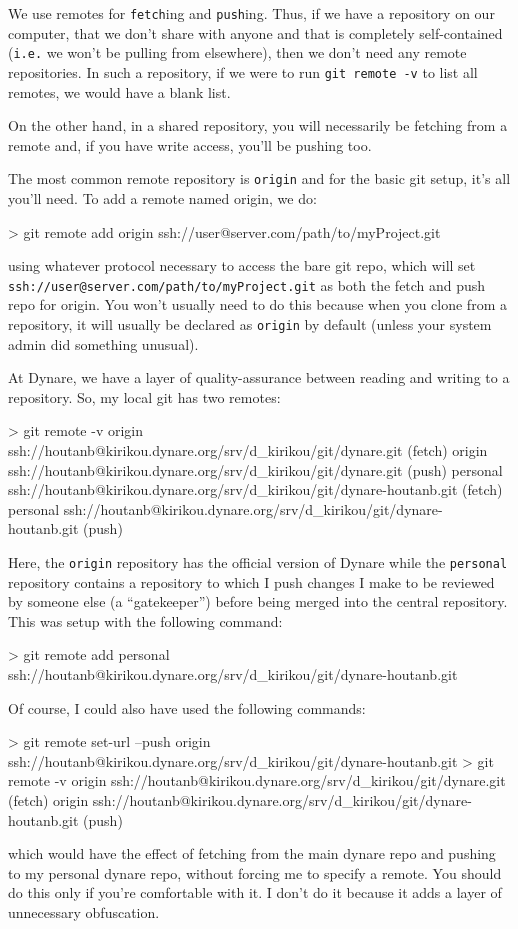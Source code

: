 \documentclass[10pt,letterpaper]{article}
\begin{document}
We use remotes for \texttt{fetch}ing and \texttt{push}ing. Thus, if we have a repository on our computer, that we don't share with anyone and that is completely self-contained (\texttt{i.e.} we won't be pulling from elsewhere), then we don't need any remote repositories. In such a repository, if we were to run \texttt{git remote -v} to list all remotes, we would have a blank list.

On the other hand, in a shared repository, you will necessarily be fetching from a remote and, if you have write access, you'll be pushing too.

The most common remote repository is \texttt{origin} and for the basic git setup, it's all you'll need. To add a remote named origin, we do:
\begin{code}
> git remote add origin ssh://user@server.com/path/to/myProject.git
\end{code}
\noindent using whatever protocol necessary to access the bare git repo, which will set \texttt{ssh://user@server.com/path/to/myProject.git} as both the fetch and push repo for origin. You won't usually need to do this because when you clone from a repository, it will usually be declared as \texttt{origin} by default (unless your system admin did something unusual).

\noindent At Dynare, we have a layer of quality-assurance between reading and writing to a repository. So, my local git has two remotes:
\begin{code}
> git remote -v
origin  ssh://houtanb@kirikou.dynare.org/srv/d_kirikou/git/dynare.git (fetch)
origin  ssh://houtanb@kirikou.dynare.org/srv/d_kirikou/git/dynare.git (push)
personal  ssh://houtanb@kirikou.dynare.org/srv/d_kirikou/git/dynare-houtanb.git (fetch)
personal  ssh://houtanb@kirikou.dynare.org/srv/d_kirikou/git/dynare-houtanb.git (push)
\end{code}
\noindent Here, the \texttt{origin} repository has the official version of Dynare while the \texttt{personal} repository contains a repository to which I push changes I make to be reviewed by someone else (a ``gatekeeper'') before being merged into the central repository. This was setup with the following command:
\begin{code}
> git remote add personal ssh://houtanb@kirikou.dynare.org/srv/d_kirikou/git/dynare-houtanb.git
\end{code}
\noindent Of course, I could also have used the following commands:
\begin{code}
> git remote set-url --push origin ssh://houtanb@kirikou.dynare.org/srv/d_kirikou/git/dynare-houtanb.git
> git remote -v
origin  ssh://houtanb@kirikou.dynare.org/srv/d_kirikou/git/dynare.git (fetch)
origin  ssh://houtanb@kirikou.dynare.org/srv/d_kirikou/git/dynare-houtanb.git (push)
\end{code}
\noindent which would have the effect of fetching from the main dynare repo and pushing to my personal dynare repo, without forcing me to specify a remote. You should do this only if you're comfortable with it. I don't do it because it adds a layer of unnecessary obfuscation.
\end{document}

